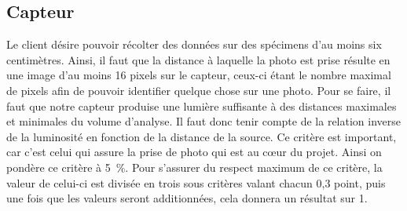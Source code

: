 

\subsection{Capteur}
\label{s:cdc_pdd_capt}

Le client désire pouvoir récolter des données sur des spécimens d’au moins six centimètres.
Ainsi, il faut que la distance à laquelle la photo est prise résulte en une image d’au moins 16 pixels sur le capteur, ceux-ci étant le nombre maximal de pixels afin de pouvoir identifier quelque chose sur une photo.
Pour se faire, il faut que notre capteur produise une lumière suffisante à des distances maximales et minimales du volume d’analyse.
Il faut donc tenir compte de la relation inverse de la luminosité en fonction de la distance de la source.
Ce critère est important, car c’est celui qui assure la prise de photo qui est au cœur du projet. Ainsi on pondère ce critère à 5~\%.
Pour s’assurer du respect maximum de ce critère, la valeur de celui-ci est divisée en trois sous critères valant chacun 0,3 point, puis une fois que les valeurs seront additionnées, cela donnera un résultat sur 1.